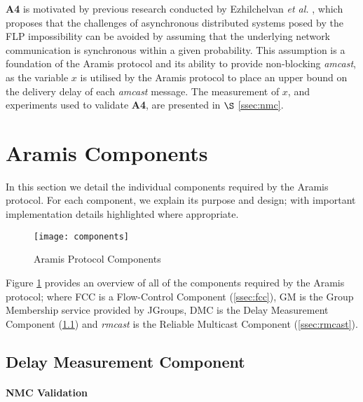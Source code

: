 \begin{description}
    	\textbf{A4} is motivated by previous research conducted by Ezhilchelvan \emph{et al.} \citep{Ezhilchelvan:2010:LPR:1773912.1773927}, which proposes that the challenges of asynchronous distributed systems posed by the FLP impossibility can be avoided by assuming that the underlying network communication is synchronous within a given probability.  This assumption is a foundation of the \textsf{Aramis} protocol and its ability to provide non-blocking \emph{amcast}, as the variable $x$ is utilised by the \textsf{Aramis} protocol to place an upper bound on the delivery delay of each \emph{amcast} message.  The measurement of $x$, and experiments used to validate \textbf{A4}, are presented in $\S$ \ref{ssec:nmc}.  	
	\end{description}
	
\section{Aramis Components}
In this section we detail the individual components required by the \textsf{Aramis} protocol.  For each component, we explain its purpose and design; with important implementation details highlighted where appropriate.  

    \begin{figure}[!h] 
        \centering    
         \texttt{[image: components]}
         \caption[Aramis Protocol Components Overview]{Aramis Protocol Components}
         \label{fig:aramis_components}
    \end{figure}
    
   Figure \ref{fig:aramis_components} provides an overview of all of the components required by the \textsf{Aramis} protocol; where FCC is a Flow-Control Component (\ref{ssec:fcc}), GM is the Group Membership service provided by JGroups, DMC is the Delay Measurement Component (\ref{ssec:dmc}) and \emph{rmcast} is the Reliable Multicast Component (\ref{ssec:rmcast}).  

	\subsection{Delay Measurement Component}\label{ssec:dmc}
	    \paragraph{NMC Validation}\label{a4_validation}\hspace{0pt} \\
	    
